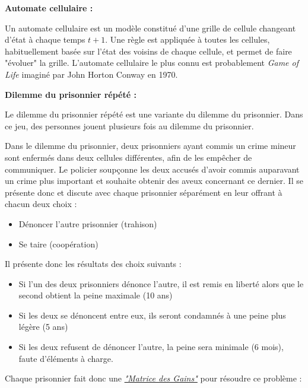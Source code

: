 \documentclass[a4paper]{article}
\begin{document}
\begin{framed}
        \textbf{Automate cellulaire :}
        
        Un automate cellulaire est un modèle constitué d'une grille de cellule changeant d'état à chaque temps $t+1$. Une règle est appliquée à toutes les cellules, habituellement basée sur l'état des voisins de chaque cellule, et permet de faire "évoluer" la grille. L'automate cellulaire le plus connu est probablement \textit{Game of Life} imaginé par John Horton Conway en 1970.

        \vspace{0.5cm}
        \textbf{Dilemme du prisonnier répété : } 
        
        Le dilemme du prisonnier répété est une variante du dilemme du prisonnier. Dans ce jeu, des personnes jouent plusieurs fois au dilemme du prisonnier. 
        
        Dans le dilemme du prisonnier, deux prisonniers ayant commis un crime mineur sont enfermés dans deux cellules différentes, afin de les empêcher de communiquer. Le policier soupçonne les deux accusés d'avoir commis auparavant un crime plus important et souhaite obtenir des aveux concernant ce dernier. Il se présente donc et discute avec chaque prisonnier séparément en leur offrant à chacun deux choix :
        \begin{itemize}
            \item Dénoncer l'autre prisonnier (trahison)
            \item Se taire (coopération)
        \end{itemize}
        
        Il présente donc les résultats des choix suivants :
        
        \begin{itemize}
            \item Si l'un des deux prisonniers dénonce l'autre, il est remis en liberté alors que le second obtient la peine maximale (10 ans)
        
            \item Si les deux se dénoncent entre eux, ils seront condamnés à une peine plus légère (5 ans)

            \item Si les deux refusent de dénoncer l'autre, la peine sera minimale (6 mois), faute d'éléments à charge.
        \end{itemize}
        
        Chaque prisonnier fait donc une \href{https://fr.wikipedia.org/wiki/Matrice\_des\_gains}{\textit{"Matrice des Gains"}} \cite{MatriceGains} pour résoudre ce problème :
        

\end{framed}
\end{document}
